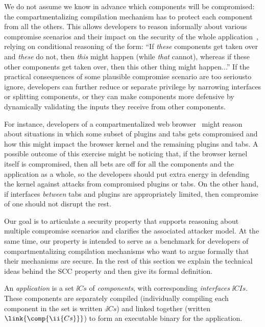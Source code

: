 \documentclass[10pt, conference, compsocconf, letterpaper, times]{IEEEtran}
\begin{document}
We do not assume we know in advance which components will be
compromised: the compartmentalizing compilation mechanism has to
protect each component from all the others.
This allows developers to reason informally about various compromise
scenarios and their impact on the security of the whole
application~\cite{GudkaWACDLMNR15}, relying on conditional
reasoning of the form: ``If {\em these} components get taken over and {\em
  these} do not, then {\em this} might happen (while {\em that} cannot),
whereas if these other components get taken over, then this other thing
might happen...''
If the practical consequences of some plausible compromise scenario are too
serious\iffull to ignore\fi,
developers can further reduce or separate privilege by
narrowing interfaces or splitting components, 
or they can make components more defensive by dynamically validating the
inputs they receive from other components.

For instance, developers of a compartmentalized web browser~\cite{ReisG09}
might reason about situations in which some subset of plugins and tabs gets
compromised and how this might impact the browser kernel and the remaining
plugins and tabs.
A possible outcome of this exercise might be noticing that, if the browser
kernel itself is compromised, then all bets are off for all the components
and the application as a whole, so the developers should put extra energy in
defending the kernel against attacks from compromised plugins or tabs.  On
the other hand, if interfaces {\em between} tabs and plugins are
appropriately limited, then compromise of one should not disrupt the rest.

Our goal is to articulate a security property that supports reasoning about
multiple compromise scenarios and clarifies the associated attacker model.
At the same time, our property is intended to serve as a benchmark for
developers of compartmentalizing compilation mechanisms who want to argue
formally that their mechanisms are secure.
In the rest of this section we explain the technical ideas behind the
SCC property and then give its formal definition.

An {\em application} is a set $\ii{Cs}$ of {\em components}, with
corresponding {\em interfaces} $\ii{CIs}$.
\iffull
{}
\fi
These components are separately compiled (individually compiling each
component in the set  is written $\comp{\ii{Cs}}$) and linked
together (written $\link{\comp{\ii{Cs}}}$) to form an executable
binary for the application.
\end{document}
